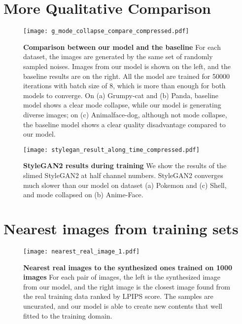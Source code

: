 \documentclass{article} \usepackage{iclr2021_conference,times}
\begin{document}
\clearpage
\section{More Qualitative Comparison}

\begin{figure}[h]
\vspace{-2mm}
\centering
\texttt{[image: g\_mode\_collapse\_compare\_compressed.pdf]}
\caption{\textbf{Comparison between our model and the baseline} For each dataset, the images are generated by the same set of randomly sampled noises. Images from our model is shown on the left, and the baseline results are on the right. All the model are trained for 50000 iterations with batch size of 8, which is more than enough for both models to converge. On (a) Grumpy-cat and (b) Panda, baseline model shows a clear mode collapse, while our model is generating diverse images; on (c) Animalface-dog, although not mode collapse, the baseline model shows a clear quality disadvantage compared to our model.}
\label{fig:style-mixing-multilayer}
\end{figure}


\begin{figure}[h]
\vspace{-2mm}
\centering
\texttt{[image: stylegan\_result\_along\_time\_compressed.pdf]}
\caption{\textbf{StyleGAN2 results during training} We show the results of the slimed StyleGAN2 at half channel numbers. StyleGAN2 converges much slower than our model on dataset (a) Pokemon and (c) Shell, and mode collapsed on (b) Anime-Face. }
\label{fig:style-mixing-multilayer}
\end{figure}

\clearpage

\section{Nearest images from training sets}

\begin{figure}[h]
\vspace{-2mm}
\centering
\texttt{[image: nearest\_real\_image\_1.pdf]}
\caption{\textbf{Nearest real images to the synthesized ones trained on 1000 images} For each pair of images, the left is the synthesized image from our model, and the right image is the closest image found from the real training data ranked by LPIPS score. The samples are uncurated, and our model is able to create new contents that well fitted to the training domain.}
\label{fig:nr_1}
\end{figure}
\clearpage
\end{document}
